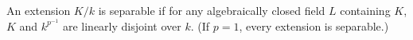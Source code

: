 An extension $K/k$ is separable if for any algebraically closed field $L$ containing $K$, $K$ and $k^{p^{-1}}$ are linearly disjoint over $k$. (If $p = 1$, every extension is separable.)
